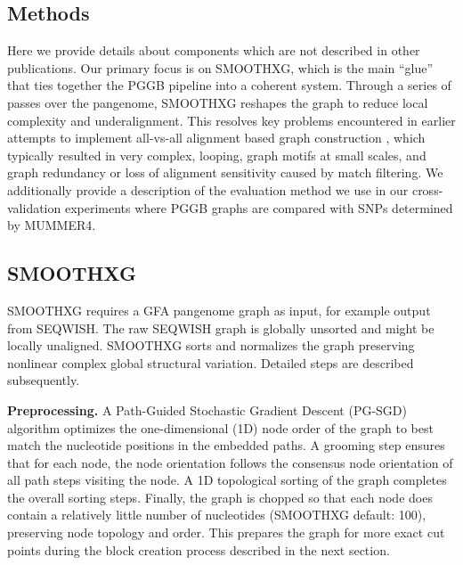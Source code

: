 \documentclass[pdflatex,mathphys]{jnl}%
\theoremstyle{thmstyleone}%
\theoremstyle{thmstyletwo}%
\theoremstyle{thmstylethree}%
\begin{document}
\begin{appendices}

\section{Methods}\label{secA1}

Here we provide details about components which are not described in other publications.
Our primary focus is on SMOOTHXG, which is the main ``glue'' that ties together the PGGB pipeline into a coherent system.
Through a series of passes over the pangenome, SMOOTHXG reshapes the graph to reduce local complexity and underalignment.
This resolves key problems encountered in earlier attempts to implement all-vs-all alignment based graph construction \cite{Llamas_2021,Garrison_seqwish_2022}, which typically resulted in very complex, looping, graph motifs at small scales, and graph redundancy or loss of alignment sensitivity caused by match filtering.
We additionally provide a description of the evaluation method we use in our cross-validation experiments where PGGB graphs are compared with SNPs determined by MUMMER4.

\subsection{SMOOTHXG}

SMOOTHXG requires a GFA pangenome graph as input, for example output from SEQWISH. The  raw SEQWISH graph is globally unsorted and might be locally unaligned. SMOOTHXG sorts and normalizes the graph preserving nonlinear complex global structural variation. Detailed steps are described subsequently. %

\textbf{Preprocessing.}
A Path-Guided Stochastic Gradient Descent (PG-SGD) algorithm optimizes the one-dimensional (1D) node order of the graph to best match the nucleotide positions in the embedded paths. A grooming step ensures that for each node, the node orientation follows the consensus node orientation of all path steps visiting the node. A 1D topological sorting of the graph completes the overall sorting steps. Finally, the graph is chopped so that each node does contain a relatively little number of nucleotides (SMOOTHXG default: 100), preserving node topology and order. This prepares the graph for more exact cut points during the block creation process described in the next section.


\end{appendices}
\end{document}
